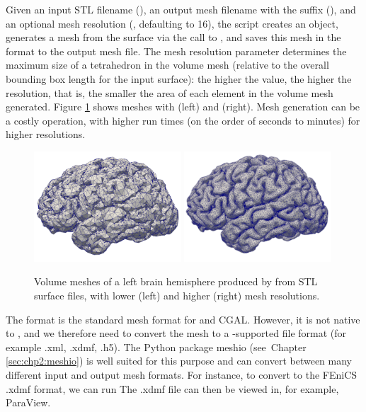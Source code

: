 \noindent Given an input STL filename (), an
output mesh filename with the  suffix
(), and an optional mesh resolution
(, defaulting to 16), the script creates an
\svmtk{}  object, generates a mesh from the
surface via the call to , and saves this
mesh in the  format to the output mesh file. The
mesh resolution parameter determines the maximum size of a tetrahedron
in the volume mesh (relative to the overall bounding box length for
the input surface): the higher the value, the higher the resolution,
that is, the smaller the area of each element in the volume mesh
generated. Figure \ref{fig:chp3:ernie-volume-mesh} shows meshes with
 (left) and  (right). Mesh generation can be a costly operation, with higher
run times (on the order of seconds to minutes) for higher resolutions.
\begin{figure}
  \includegraphics[width=0.49\textwidth]{./graphics/chp3/ernie-volume-16-r.png}
  \includegraphics[width=0.49\textwidth]{./graphics/chp3/ernie-volume-64-r.png}
  \caption{Volume meshes of a left brain hemisphere produced by
    {\svmtk} from STL surface files, with lower (left) and higher
    (right) mesh resolutions.}
  \label{fig:chp3:ernie-volume-mesh}
\end{figure}

The  format is the standard mesh format for \svmtk{} and
CGAL. However, it is not native to \fenics{}, and we therefore need to
convert the mesh to a \fenics-supported file format (for example .xml, .xdmf,
.h5). The Python package meshio (see~Chapter
\ref{sec:chp2:meshio}) is well suited for this purpose and can
convert between many different input and output mesh formats. For
instance, to convert to the FEniCS .xdmf format, we can run
\noindent The .xdmf file can then be viewed in, for example, ParaView.

